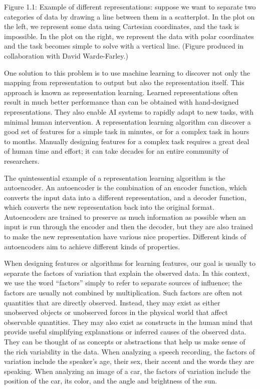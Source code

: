 \documentclass[11pt]{article}
\begin{document}
Figure 1.1:
Example of different representations: suppose we want to separate two
categories of data by drawing a line between them in a scatterplot.
In the plot on the left, we represent some data using Cartesian coordinates, and the task is impossible.
In the plot on the right, we represent the data with polar coordinates and the task becomes simple to
solve with a vertical line. (Figure produced in collaboration with David Warde-Farley.)


One solution to this problem is to use machine learning to discover not only the mapping from representation to output but also the representation itself.
This approach is known as representation learning.
Learned representations often result in much better performance than can be obtained with hand-designed representations.
They also enable AI systems to rapidly adapt to new tasks, with minimal human intervention.
A representation learning algorithm can discover a good set of features for a simple task in minutes, or for a complex task in hours to months.
Manually designing features for a complex task requires a great deal of human time and effort;
it can take decades for an entire community of researchers.

The quintessential example of a representation learning algorithm is the autoencoder.
An autoencoder is the combination of an encoder function, which converts the input data into a different representation, and a decoder function, which converts the new representation back into the original format.
Autoencoders are trained to preserve as much information as possible when an input is run through the encoder and then the decoder, but they are also trained to make the new representation have various nice properties.
Different kinds of autoencoders aim to achieve different kinds of properties.

When designing features or algorithms for learning features, our goal is usually to separate the factors of variation that explain the observed data.
In this context, we use the word “factors” simply to refer to separate sources of inﬂuence;
the factors are usually not combined by multiplication.
Such factors are often not quantities that are directly observed.
Instead, they may exist as either unobserved objects or unobserved forces in the physical world that aﬀect observable quantities.
They may also exist as constructs in the human mind that provide useful simplifying explanations or inferred causes of the observed data.
They can be thought of as concepts or abstractions that help us make sense of the rich variability in the data.
When analyzing a speech recording, the factors of variation include the speaker’s
age, their sex, their accent and the words they are speaking.
When analyzing an image of a car, the factors of variation include the position of the car, its color, and the angle and brightness of the sun.
\end{document}
